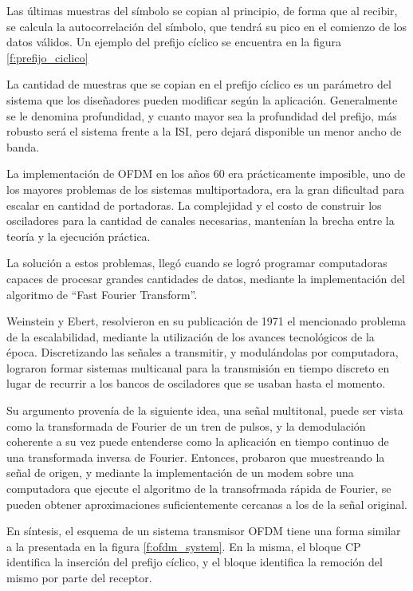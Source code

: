 Las últimas muestras del símbolo se copian al principio, de forma que al recibir, se calcula la autocorrelación del símbolo, que tendrá su pico en el comienzo de los datos válidos. Un ejemplo del prefijo cíclico se encuentra en la figura \ref{f:prefijo_ciclico}

La cantidad de muestras que se copian en el prefijo cíclico es un parámetro del sistema que los diseñadores pueden modificar según la aplicación. Generalmente se le denomina profundidad, y cuanto mayor sea la profundidad del prefijo, más robusto será el sistema frente a la \gls{ISI}, pero dejará disponible un menor ancho de banda.

La implementación de OFDM en los años 60 era prácticamente imposible, uno de los mayores problemas de los sistemas multiportadora, era la gran dificultad para escalar en cantidad de portadoras. La complejidad y el costo de construir los osciladores para la cantidad de canales necesarias, mantenían la brecha entre la teoría y la ejecución práctica. 

La solución a estos problemas, llegó cuando se logró programar computadoras capaces de procesar grandes cantidades de datos, mediante la implementación del algoritmo de “Fast Fourier Transform”. 

Weinstein y Ebert, resolvieron en  su publicación de 1971 \cite{discrete-ofdm} el mencionado problema de la escalabilidad, mediante la utilización de los avances tecnológicos de la época. Discretizando las señales a transmitir, y modulándolas por computadora, lograron formar sistemas multicanal para la transmisión en tiempo discreto en lugar de recurrir a los bancos de osciladores que se usaban hasta el momento. 

Su argumento provenía de la siguiente idea, una señal multitonal, puede ser vista como la transformada de Fourier de un tren de pulsos, y la demodulación coherente a su vez puede entenderse como la aplicación en tiempo continuo de una transformada inversa de Fourier. Entonces, probaron que muestreando la señal de origen, y mediante la implementación de un modem sobre una computadora que ejecute el algoritmo de la transofrmada rápida de Fourier, se pueden obtener aproximaciones suficientemente cercanas a los de la señal original. 

En síntesis, el esquema de un sistema transmisor OFDM tiene una forma similar a la presentada en la figura \ref{f:ofdm_system}. En la misma, el bloque \gls{CP} identifica la inserción del prefijo cíclico, y el bloque  identifica la remoción del mismo por parte del receptor.

